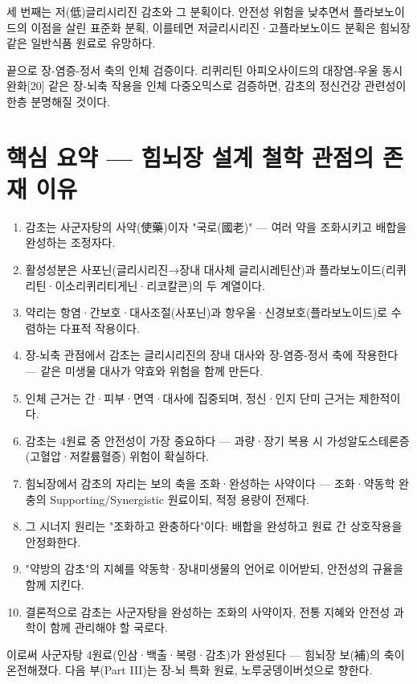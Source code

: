 \documentclass[12pt,oneside]{book}
\begin{document}
세 번째는 저(低)글리시리진 감초와 그 분획이다. 안전성 위험을 낮추면서 플라보노이드의 이점을 살린 표준화 분획, 이를테면 저글리시리진·고플라보노이드 분획은 힘뇌장 같은 일반식품 원료로 유망하다.

끝으로 장-염증-정서 축의 인체 검증이다. 리퀴리틴 아피오사이드의 대장염-우울 동시 완화[20] 같은 장-뇌축 작용을 인체 다중오믹스로 검증하면, 감초의 정신건강 관련성이 한층 분명해질 것이다.

\section{핵심 요약 — 힘뇌장 설계 철학 관점의 존재 이유}

\begin{enumerate}[leftmargin=6mm,itemsep=1pt,topsep=2pt]
  \item 감초는 사군자탕의 사약(使藥)이자 "국로(國老)" — 여러 약을 조화시키고 배합을 완성하는 조정자다.
  \item 활성성분은 사포닌(글리시리진→장내 대사체 글리시레틴산)과 플라보노이드(리퀴리틴·이소리퀴리티게닌·리코칼콘)의 두 계열이다.
  \item 약리는 항염·간보호·대사조절(사포닌)과 항우울·신경보호(플라보노이드)로 수렴하는 다표적 작용이다.
  \item 장-뇌축 관점에서 감초는 글리시리진의 장내 대사와 장-염증-정서 축에 작용한다 — 같은 미생물 대사가 약효와 위험을 함께 만든다.
  \item 인체 근거는 간·피부·면역·대사에 집중되며, 정신·인지 단미 근거는 제한적이다.
  \item 감초는 4원료 중 안전성이 가장 중요하다 — 과량·장기 복용 시 가성알도스테론증(고혈압·저칼륨혈증) 위험이 확실하다.
  \item 힘뇌장에서 감초의 자리는 보의 축을 조화·완성하는 사약이다 — 조화·약동학 완충의 Supporting/Synergistic 원료이되, 적정 용량이 전제다.
  \item 그 시너지 원리는 "조화하고 완충하다"이다: 배합을 완성하고 원료 간 상호작용을 안정화한다.
  \item "약방의 감초"의 지혜를 약동학·장내미생물의 언어로 이어받되, 안전성의 규율을 함께 지킨다.
  \item 결론적으로 감초는 사군자탕을 완성하는 조화의 사약이자, 전통 지혜와 안전성 과학이 함께 관리해야 할 국로다.
\end{enumerate}

이로써 사군자탕 4원료(인삼·백출·복령·감초)가 완성된다 — 힘뇌장 보(補)의 축이 온전해졌다. 다음 부(Part III)는 장-뇌 특화 원료, 노루궁뎅이버섯으로 향한다.
\end{document}
